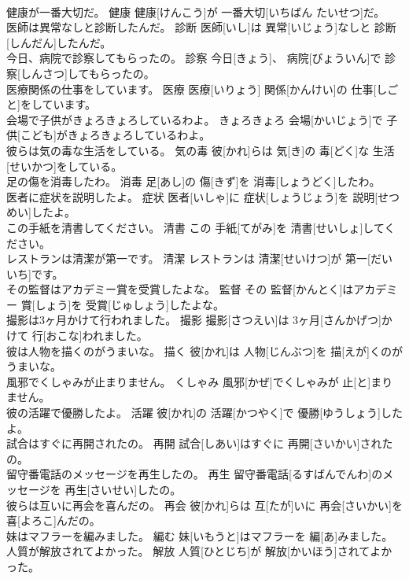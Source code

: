 \documentclass[8pt]{extreport}
\begin{document}
\begin{CJK}{UTF8}{min}
\\	健康が一番大切だ。	健康	健康[けんこう]が 一番大切[いちばん たいせつ]だ。	
\\	医師は異常なしと診断したんだ。	診断	医師[いし]は 異常[いじょう]なしと 診断[しんだん]したんだ。	
\\	今日、病院で診察してもらったの。	診察	今日[きょう]、 病院[びょういん]で 診察[しんさつ]してもらったの。	
\\	医療関係の仕事をしています。	医療	医療[いりょう] 関係[かんけい]の 仕事[しごと]をしています。	
\\	会場で子供がきょろきょろしているわよ。	きょろきょろ	会場[かいじょう]で 子供[こども]がきょろきょろしているわよ。	
\\	彼らは気の毒な生活をしている。	気の毒	彼[かれ]らは 気[き]の 毒[どく]な 生活[せいかつ]をしている。	
\\	足の傷を消毒したわ。	消毒	足[あし]の 傷[きず]を 消毒[しょうどく]したわ。	
\\	医者に症状を説明したよ。	症状	医者[いしゃ]に 症状[しょうじょう]を 説明[せつめい]したよ。	
\\	この手紙を清書してください。	清書	この 手紙[てがみ]を 清書[せいしょ]してください。	
\\	レストランは清潔が第一です。	清潔	レストランは 清潔[せいけつ]が 第一[だいいち]です。	
\\	その監督はアカデミー賞を受賞したよな。	監督	その 監督[かんとく]はアカデミー 賞[しょう]を 受賞[じゅしょう]したよな。	
\\	撮影は3ヶ月かけて行われました。	撮影	撮影[さつえい]は 3ヶ月[さんかげつ]かけて 行[おこな]われました。	
\\	彼は人物を描くのがうまいな。	描く	彼[かれ]は 人物[じんぶつ]を 描[えが]くのがうまいな。	
\\	風邪でくしゃみが止まりません。	くしゃみ	風邪[かぜ]でくしゃみが 止[と]まりません。	
\\	彼の活躍で優勝したよ。	活躍	彼[かれ]の 活躍[かつやく]で 優勝[ゆうしょう]したよ。	
\\	試合はすぐに再開されたの。	再開	試合[しあい]はすぐに 再開[さいかい]されたの。	
\\	留守番電話のメッセージを再生したの。	再生	留守番電話[るすばんでんわ]のメッセージを 再生[さいせい]したの。	
\\	彼らは互いに再会を喜んだの。	再会	彼[かれ]らは 互[たが]いに 再会[さいかい]を 喜[よろこ]んだの。	
\\	妹はマフラーを編みました。	編む	妹[いもうと]はマフラーを 編[あ]みました。	
\\	人質が解放されてよかった。	解放	人質[ひとじち]が 解放[かいほう]されてよかった。	

\end{CJK}
\end{document}
